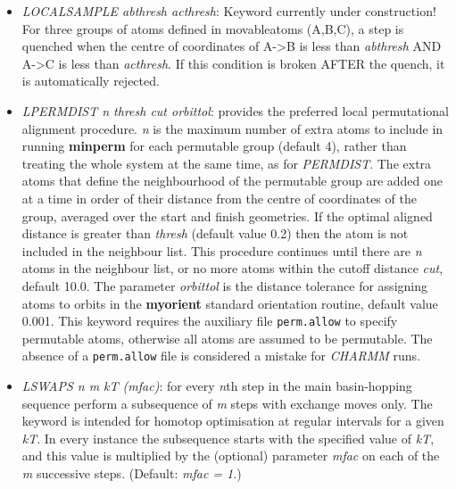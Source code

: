 \documentclass[12pt,a4paper,dvips]{article}
\begin{document}
\begin{itemize}
\item {\it LOCALSAMPLE abthresh acthresh\/}: Keyword currently under construction! For three groups of atoms defined in movableatoms
(A,B,C), a step is quenched when the centre of coordinates of A-\textgreater B is less than {\it abthresh} AND A-\textgreater C is less than {\it acthresh}. 
If this condition is broken AFTER the quench, it is automatically rejected.

\item {\it LPERMDIST n thresh cut orbittol\/}: provides the preferred local
permutational alignment procedure.
{\it n\/} is the maximum number of extra atoms to include in running
{\bf minperm\/} for each permutable group (default 4), rather than
treating the whole system at the same time, as for {\it PERMDIST}.
The extra atoms that define the neighbourhood of the permutable group are
added one at a time in order of their distance from the centre of coordinates of the
group, averaged over the start and finish geometries.
If the optimal aligned distance is greater than {\it thresh\/} (default value 0.2)
then the atom is not included in the neighbour list.
This procedure continues until there are {\it n\/} atoms in the neighbour list,
or no more atoms within the cutoff distance {\it cut\/}, default 10.0.
The parameter {\it orbittol} is the distance tolerance for assigning atoms to orbits
in the {\bf myorient} standard orientation routine, default value 0.001.
This keyword requires the auxiliary file {\tt perm.allow} to specify permutable atoms, otherwise
all atoms are assumed to be permutable. The absence of a {\tt perm.allow}
file is considered a mistake for {\it CHARMM\/} runs.

\item {\it LSWAPS n m kT (mfac)\/}: for every {\it n}th step in the main basin-hopping sequence perform a subsequence of {\it m} steps with exchange moves only. The keyword is intended for homotop optimisation at regular intervals for a given {\it kT}. In every instance the subsequence starts with the specified value of {\it kT}, and this value is multiplied by the (optional) parameter {\it mfac} on each of the {\it m} successive steps. (Default: {\it mfac = 1}.)


\end{itemize}
\end{document}
